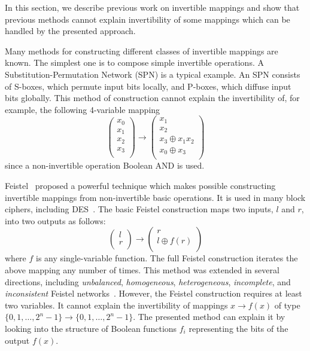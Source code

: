 \documentclass[9pt,conference]{IEEEtran} \usepackage{times}
\begin{document}
In this section, we describe previous work on invertible mappings and
show that previous methods cannot explain invertibility of some mappings which
can be handled by the presented approach.

Many methods for constructing different classes of invertible mappings are known.
The simplest one is to compose simple invertible operations. A Substitution-Permutation Network (SPN)
is a typical example. An SPN consists of S-boxes, which permute input bits locally,
and P-boxes, which diffuse input bits globally. This method of construction
cannot explain the invertibility of, for example, the following 4-variable 
mapping
\begin{equation} \label{ex}
\left(
\begin{array}{c}
x_0\\
x_1\\
x_2\\
x_3\\
\end{array}
\right)
\rightarrow
\left(
\begin{array}{c}
x_1\\
x_2\\
x_3 \oplus x_1 x_2\\
x_0 \oplus x_3\\
\end{array}
\right)
\end{equation}
since a non-invertible operation Boolean AND is used.

Feistel~\cite{Fe73} proposed a powerful technique which makes possible constructing invertible mappings from non-invertible basic operations. It is used in many block ciphers, including DES~\cite{DES77}.
The basic Feistel construction maps two inputs, $l$ and $r$, into two outputs as follows:
\[
\left(
\begin{array}{c}
l\\
r\\
\end{array}
\right)
\rightarrow
\left(
\begin{array}{cc}
r\\
l \oplus f(r)\\
\end{array}
\right)
\]
where $f$ is any single-variable function. The full Feistel construction iterates the above mapping any number of times. This method was extended in several directions, including {\em unbalanced}, {\em homogeneous}, {\em heterogeneous}, {\em incomplete}, and {\em inconsistent} Feistel networks~\cite{ScK96}. However, the Feistel construction requires at least two variables. It cannot explain the invertibility of mappings $x \rightarrow f(x)$ of type $\{0,1,\ldots,2^n-1\} \rightarrow \{0,1,\ldots,2^n-1\}$. 
The presented method can explain it by looking into the structure of
Boolean functions $f_i$ representing the bits of the output $f(x)$.
\end{document}

